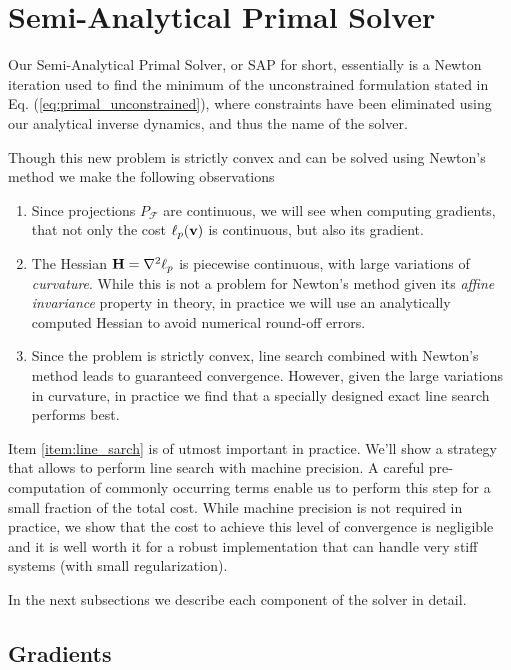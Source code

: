 \section{Semi-Analytical Primal Solver}
\label{sec:sap_solver}

Our Semi-Analytical Primal Solver, or SAP for short, essentially is a Newton
iteration used to find the minimum of the unconstrained formulation stated in
Eq. (\ref{eq:primal_unconstrained}), where constraints have been eliminated
using our analytical inverse dynamics, and thus the name of the solver.

Though this new problem is strictly convex and can be solved using Newton's method
we make the following observations
\begin{enumerate}
	\item Since projections $P_\mathcal{F}$ are continuous, we will see when
	computing gradients, that not only the cost $\ell_p({\mathbf{v}})$ is continuous,
	but also its gradient.
	\item The Hessian ${\mathbf{H}}=\nabla^2\ell_p$ is piecewise continuous, with
	large variations of \textit{curvature}. While this is not a problem for
	Newton's method given its \textit{affine invariance} property in theory, in
	practice we will use an analytically computed Hessian to avoid numerical
	round-off errors.
	\item\label{item:line_sarch} Since the problem is strictly convex, line
	search combined with Newton's method leads to guaranteed convergence.
	However, given the large variations in curvature, in practice we find that a
	specially designed exact line search performs best.
\end{enumerate}

Item \ref{item:line_sarch} is of utmost important in practice. We'll show a
strategy that allows to perform line search with machine precision. A
careful pre-computation of commonly occurring terms enable us to perform this
step for a small fraction of the total cost. While machine precision is
not required in practice, we show that the cost to achieve this level of
convergence is negligible and it is well worth it for a robust implementation
that can handle very stiff systems (with small regularization).

In the next subsections we describe each component of the solver in detail.

\subsection{Gradients}
\label{sec:gradients}

